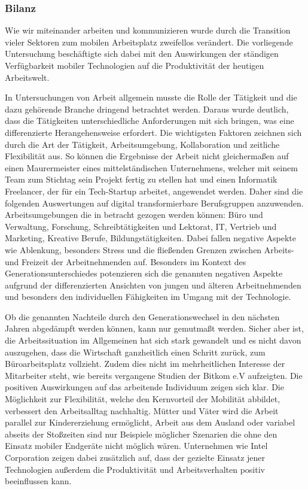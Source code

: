\documentclass[12pt,a4paper]{article}
\begin{document}
\subsubsection*{Bilanz}
Wie wir miteinander arbeiten und kommunizieren wurde durch die Transition vieler Sektoren zum mobilen Arbeitsplatz zweifellos verändert. Die vorliegende Untersuchung beschäftigte sich dabei mit den Auswirkungen der ständigen Verfügbarkeit mobiler Technologien auf die Produktivität der heutigen Arbeitswelt.  

In Untersuchungen von Arbeit allgemein musste die Rolle der Tätigkeit und die dazu gehörende Branche dringend betrachtet werden. Daraus wurde deutlich, dass die Tätigkeiten unterschiedliche Anforderungen mit sich bringen, was eine differenzierte Herangehensweise erfordert. Die wichtigsten Faktoren zeichnen sich durch die Art der Tätigkeit, Arbeitsumgebung, Kollaboration und zeitliche Flexibilität aus. So können die Ergebnisse der Arbeit nicht gleichermaßen auf einen Maurermeister eines mittelständischen Unternehmens, welcher mit seinem Team zum Stichtag sein Projekt fertig zu stellen hat und einen Informatik Freelancer, der für ein Tech-Startup arbeitet, angewendet werden. Daher sind die folgenden Auswertungen auf digital transformierbare Berufsgruppen anzuwenden. Arbeitsumgebungen die in betracht gezogen werden können: Büro und Verwaltung, Forschung, Schreibtätigkeiten und Lektorat, IT, Vertrieb und Marketing, Kreative Berufe, Bildungstätigkeiten. Dabei fallen negative Aspekte wie Ablenkung, besonders Stress und die fließenden Grenzen zwischen Arbeits- und Freizeit der Arbeitnehmenden auf. Besonders im Kontext des Generationsunterschiedes potenzieren sich die genannten negativen Aspekte aufgrund der differenzierten Ansichten von jungen und älteren Arbeitnehmenden und besonders den individuellen Fähigkeiten im Umgang mit der Technologie. 

Ob die genannten Nachteile durch den Generationswechsel in den nächsten Jahren abgedämpft werden können, kann nur gemutmaßt werden. Sicher aber ist, die Arbeitssituation im Allgemeinen hat sich stark gewandelt und es nicht davon auszugehen, dass die Wirtschaft ganzheitlich einen Schritt zurück, zum Büroarbeitsplatz vollzieht. Zudem dies nicht im mehrheitlichen Interesse der Mitarbeiter steht, wie bereits vergangene Studien der Bitkom e.V aufzeigten. Die positiven Auswirkungen auf das arbeitende Individuum zeigen sich klar. Die Möglichkeit zur Flexibilität, welche den Kernvorteil der Mobilität abbildet, verbessert den Arbeitsalltag nachhaltig. Mütter und Väter wird die Arbeit parallel zur Kindererziehung ermöglicht, Arbeit aus dem Ausland oder variabel abseits der Stoßzeiten sind nur Beispiele möglicher Szenarien die ohne den Einsatz mobiler Endgeräte nicht möglich wären. Unternehmen wie Intel Corporation zeigen dabei zusätzlich auf, dass der gezielte Einsatz jener Technologien außerdem die Produktivität und Arbeitsverhalten positiv beeinflussen kann.  
\end{document}

